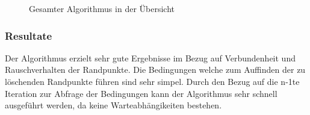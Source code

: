 \begin{figure}[!ht]
  \centering
   \caption{Gesamter Algorithmus in der Übersicht}
\end{figure}







\subsubsection{Resultate}

Der Algorithmus erzielt sehr gute Ergebnisse im Bezug auf Verbundenheit und Rauschverhalten der Randpunkte. Die Bedingungen welche zum Auffinden der zu löschenden Randpunkte führen sind sehr simpel. Durch den Bezug auf die n-1te Iteration zur Abfrage der Bedingungen kann der Algorithmus sehr schnell ausgeführt werden, da keine Warteabhängikeiten bestehen.

\newpage
